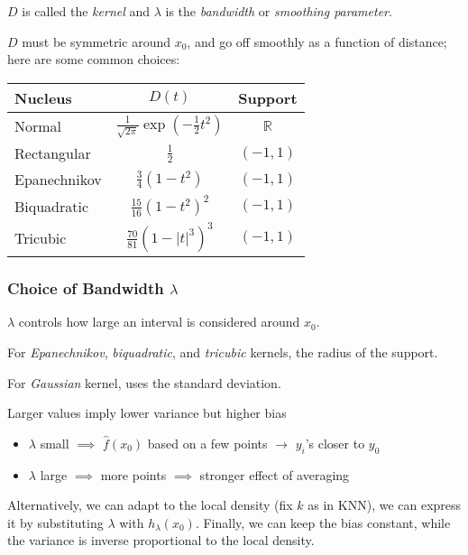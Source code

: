 \documentclass[twoside,twocolumn,10pt]{revtex4-1}
\begin{document}
	$D$ is called the \textit{kernel} and $\lambda$ is the \textit{bandwidth} or \textit{smoothing parameter}.
	
	$D$ must be symmetric around $x_0$, and go off smoothly as a function of distance; here are some common choices:
	
	\begin{tabular}{l c c}
	\textbf{Nucleus} & $D(t)$ & \textbf{Support} \\
	\hline
	Normal & $\frac{1}{\sqrt{2 \pi}} \exp ( -\frac{1}{2} t^2 )$ & $\mathbb{R}$ \\
	Rectangular & $\frac{1}{2}$ & $(-1,1)$ \\
	Epanechnikov & $\frac{3}{4} (1-t^2)$ & $(-1,1)$ \\
	Biquadratic & $\frac{15}{16} (1-t^2)^2$ & $(-1,1)$ \\
	Tricubic & $\frac{70}{81} (1-|t|^3)^3$ & $(-1,1)$ 
	\end{tabular}
	
	\subsubsection{Choice of Bandwidth $\lambda$}
	
	$\lambda$ controls how large an interval is considered around $x_0$.  
	
	For \textit{Epanechnikov}, \textit{biquadratic}, and \textit{tricubic} kernels, the radius of the support.
	
	For \textit{Gaussian} kernel, uses the standard deviation.
	
	Larger values imply lower variance but higher bias
	
	\begin{itemize}
	\item $\lambda$ small $\implies$ $\hat{f}(x_0)$ based on a few points $\to$ $y_i$'s closer to $y_0$
	\item $\lambda$ large $\implies$ more points $\implies$ stronger effect of averaging
	\end{itemize}
	
	Alternatively, we can adapt to the local density (fix $k$ as in KNN), we can express it by substituting $\lambda$ with $h_\lambda (x_0)$.  Finally, we can keep the bias constant, while the variance is inverse proportional to the local density.
	
	
	
\end{document}
